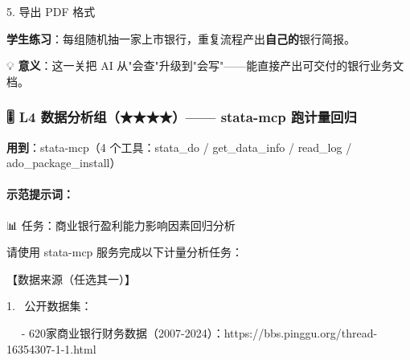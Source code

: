 \documentclass[
  american,
  chinese,
]{ctexart}
\begin{document}
\foreignlanguage{american}{5. }{导出}\foreignlanguage{american}{ PDF }{格式}\foreignlanguage{american}{}

\textbf{{学生练习}}{：每组随机抽一家上市银行，重复流程产出\textbf{自己的}银行简报。}\foreignlanguage{american}{}

\foreignlanguage{american}{💡 }\textbf{{意义}}{：这一关把}\foreignlanguage{american}{ AI }{从}\foreignlanguage{american}{"}{会查}\foreignlanguage{american}{"}{升级到}\foreignlanguage{american}{"}{会写}\foreignlanguage{american}{"------}{能直接产出可交付的银行业务文档。}\foreignlanguage{american}{}

\subsubsection{\texorpdfstring{\foreignlanguage{american}{🎚️ L4 }{\foreignlanguage{american}{数据分析组}}\foreignlanguage{american}{（}\foreignlanguage{american}{★★★★}\foreignlanguage{american}{）}\foreignlanguage{american}{------
{stata-mcp} }{\foreignlanguage{american}{跑计量回归}}}{🎚️ L4 数据分析组（★★★★）------ stata-mcp 跑计量回归}}\label{l4-ux6570ux636eux5206ux6790ux7ec4-stata-mcp-ux8dd1ux8ba1ux91cfux56deux5f52}

\textbf{\foreignlanguage{american}{用到}}\foreignlanguage{american}{：}\foreignlanguage{american}{stata-mcp}\foreignlanguage{american}{（}\foreignlanguage{american}{4 }{\foreignlanguage{american}{个工具：}\foreignlanguage{american}{stata\_do}}\foreignlanguage{american}{ / {get\_data\_info}
/ {read\_log} / {ado\_package\_install}}\foreignlanguage{american}{）}

\paragraph{\texorpdfstring{{示范提示词：}\foreignlanguage{american}{}}{示范提示词：}}\label{ux793aux8303ux63d0ux793aux8bcd-1}

\foreignlanguage{american}{📊}\foreignlanguage{american}{ }{任务：商业银行盈利能力影响因素回归分析}\foreignlanguage{american}{}

{请使用}\foreignlanguage{american}{ {stata-mcp} }{服务完成以下计量分析任务：}\foreignlanguage{american}{}

{【数据来源（任选其一）】}\foreignlanguage{american}{}

\foreignlanguage{american}{1.{~ }}{公开数据集：}\foreignlanguage{american}{}

\foreignlanguage{american}{{~~ }- 620}{家商业银行财务数据（}\foreignlanguage{american}{2007-2024}{）：}\foreignlanguage{american}{https://bbs.pinggu.org/thread-16354307-1-1.html}
\end{document}
